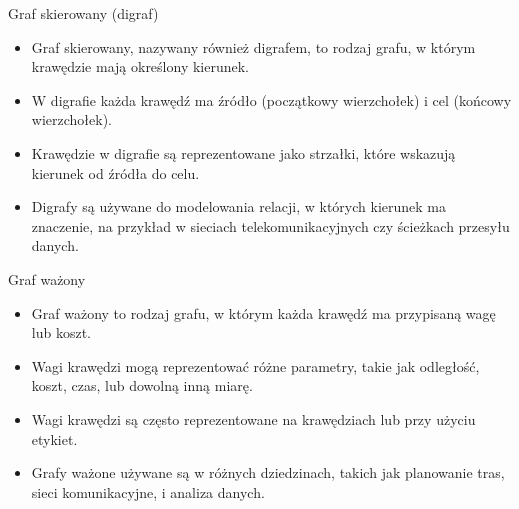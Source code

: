 \documentclass[polish,envcountsect,10pt]{beamer}
\begin{document}
\begin{frame}{Graf skierowany (digraf)}
    \begin{itemize}
    \item Graf skierowany, nazywany również digrafem, to rodzaj grafu, w którym krawędzie mają określony kierunek.
    \item W digrafie każda krawędź ma źródło (początkowy wierzchołek) i cel (końcowy wierzchołek).
    \item Krawędzie w digrafie są reprezentowane jako strzałki, które wskazują kierunek od źródła do celu.
    \item Digrafy są używane do modelowania relacji, w których kierunek ma znaczenie, na przykład w sieciach telekomunikacyjnych czy ścieżkach przesyłu danych.
    \end{itemize}

    \begin{center}
    \end{center}
\end{frame}

\begin{frame}{Graf ważony}
    \begin{itemize}
        \item Graf ważony to rodzaj grafu, w którym każda krawędź ma przypisaną wagę lub koszt.
        \item Wagi krawędzi mogą reprezentować różne parametry, takie jak odległość, koszt, czas, lub dowolną inną miarę.
        \item Wagi krawędzi są często reprezentowane na krawędziach lub przy użyciu etykiet.
        \item Grafy ważone używane są w różnych dziedzinach, takich jak planowanie tras, sieci komunikacyjne, i analiza danych.
    \end{itemize}
    \begin{center}
    \end{center}
\end{frame}
\end{document}
